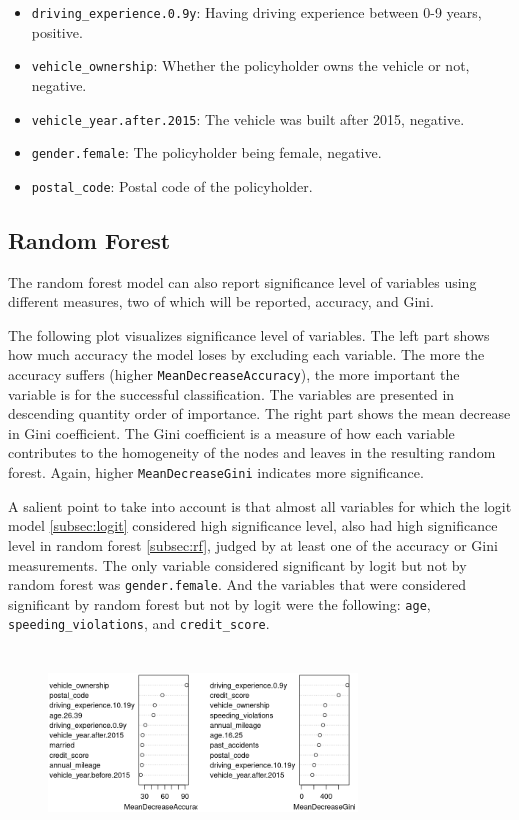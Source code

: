 \documentclass{article}
\providecommand{\tightlist}{%
  \setlength{\itemsep}{0pt}\setlength{\parskip}{0pt}}
\begin{document}
\begin{itemize}
\tightlist
\item
  \texttt{driving\_experience.0.9y}: Having driving experience between
  0-9 years, positive.
\item
  \texttt{vehicle\_ownership}: Whether the policyholder owns the vehicle
  or not, negative.
\item
  \texttt{vehicle\_year.after.2015}: The vehicle was built after 2015,
  negative.
\item
  \texttt{gender.female}: The policyholder being female, negative.
\item
  \texttt{postal\_code}: Postal code of the policyholder.
\end{itemize}

\hypertarget{random-forest}{%
\subsection{\texorpdfstring{Random Forest
\label{subsec:rf}}{Random Forest }}\label{random-forest}}

The random forest model can also report significance level of variables
using different measures, two of which will be reported, accuracy, and
Gini.

The following plot visualizes significance level of variables. The left
part shows how much accuracy the model loses by excluding each variable.
The more the accuracy suffers (higher \texttt{MeanDecreaseAccuracy}),
the more important the variable is for the successful classification.
The variables are presented in descending quantity order of importance.
The right part shows the mean decrease in Gini coefficient. The Gini
coefficient is a measure of how each variable contributes to the
homogeneity of the nodes and leaves in the resulting random forest.
Again, higher \texttt{MeanDecreaseGini} indicates more significance.

A salient point to take into account is that almost all variables for
which the logit model \ref{subsec:logit} considered high significance
level, also had high significance level in random forest
\ref{subsec:rf}, judged by at least one of the accuracy or Gini
measurements. The only variable considered significant by logit but not
by random forest was \texttt{gender.female}. And the variables that were
considered significant by random forest but not by logit were the
following: \texttt{age}, \texttt{speeding\_violations}, and
\texttt{credit\_score}.

\begin{figure}[H] 
    \centerline{\includegraphics[width=8.2cm, height=5cm]{./figures/varimp.png}}
\end{figure}
\end{document}

